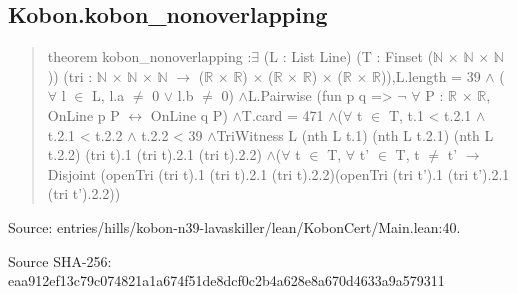 \documentclass[11pt,a4paper]{article}
\begin{document}
\begin{samepage}
\subsection{Kobon.kobon\_nonoverlapping}
\begin{quote}\small\ttfamily theorem kobon\_nonoverlapping :\newline     \ensuremath{\exists} (L : List Line) (T : Finset (\ensuremath{\mathbb{N}} \ensuremath{\times} \ensuremath{\mathbb{N}} \ensuremath{\times} \ensuremath{\mathbb{N}})) (tri : \ensuremath{\mathbb{N}} \ensuremath{\times} \ensuremath{\mathbb{N}} \ensuremath{\times} \ensuremath{\mathbb{N}} \ensuremath{\to} (\ensuremath{\mathbb{R}} \ensuremath{\times} \ensuremath{\mathbb{R}}) \ensuremath{\times} (\ensuremath{\mathbb{R}} \ensuremath{\times} \ensuremath{\mathbb{R}}) \ensuremath{\times} (\ensuremath{\mathbb{R}} \ensuremath{\times} \ensuremath{\mathbb{R}})),\newline       L.length = 39 \ensuremath{\wedge} (\ensuremath{\forall} l \ensuremath{\in} L, l.a \ensuremath{\neq} 0 \ensuremath{\vee} l.b \ensuremath{\neq} 0) \ensuremath{\wedge}\newline       L.Pairwise (fun p q => \ensuremath{\neg} \ensuremath{\forall} P : \ensuremath{\mathbb{R}} \ensuremath{\times} \ensuremath{\mathbb{R}}, OnLine p P \ensuremath{\leftrightarrow} OnLine q P) \ensuremath{\wedge}\newline       T.card = 471 \ensuremath{\wedge}\newline       (\ensuremath{\forall} t \ensuremath{\in} T, t.1 < t.2.1 \ensuremath{\wedge} t.2.1 < t.2.2 \ensuremath{\wedge} t.2.2 < 39 \ensuremath{\wedge}\newline         TriWitness L (nth L t.1) (nth L t.2.1) (nth L t.2.2) (tri t).1 (tri t).2.1 (tri t).2.2) \ensuremath{\wedge}\newline       (\ensuremath{\forall} t \ensuremath{\in} T, \ensuremath{\forall} t' \ensuremath{\in} T, t \ensuremath{\neq} t' \ensuremath{\to}\newline         Disjoint (openTri (tri t).1 (tri t).2.1 (tri t).2.2)\newline           (openTri (tri t').1 (tri t').2.1 (tri t').2.2))\end{quote}
{\small Source: entries/hills/kobon-n39-lavaskiller/lean/KobonCert/Main.lean:40.\par}

{\small Source SHA-256: eaa912ef13c79c074821a1a674f51de8dcf0c2b4a628e8a670d4633a9a579311\par}


\end{samepage}
\end{document}

